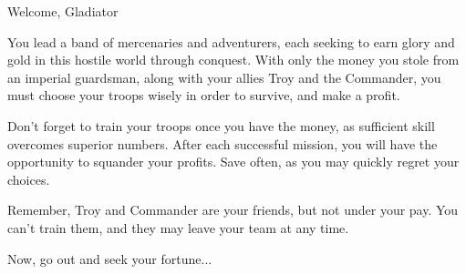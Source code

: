           Welcome, Gladiator

 You lead a band of mercenaries 
and adventurers, each seeking to 
earn glory and gold in this hostile 
world through conquest.  With only 
the money you stole from an imperial 
guardsman, along with your allies 
Troy and the Commander, you must 
choose your troops wisely in
order to survive, and make a profit.

  Don't forget to train your 
troops once you have the money, as 
sufficient skill overcomes superior 
numbers. After each successful 
mission, you will have the opportunity 
to squander your profits.  Save often, 
as you may quickly regret your choices.

  Remember, Troy and Commander
are your friends, but not under your
pay.  You can't train them, and they
may leave your team at any time.

  Now, go out and seek your fortune...

